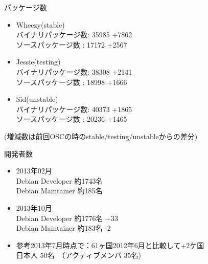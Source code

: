 \begin{frame}{パッケージ数}
\begin{itemize}

\item Wheezy(stable)\\
バイナリパッケージ数: 35985 {\color{red}+7862}\\
ソースパッケージ数  : 17172 {\color{red}+2567}\\
\item Jessie(testing)\\ 
バイナリパッケージ数: 38308 {\color{red}+2141}\\
ソースパッケージ数  : 18998 {\color{red}+1666}\\
\item Sid(unstable)\\ 
バイナリパッケージ数: 40373 {\color{red}+1865}\\
ソースパッケージ数  : 20236 {\color{red}+1465}\\
\end{itemize}
(増減数は前回OSCの時のstable/testing/unstableからの差分)
\end{frame}



\begin{frame}{開発者数}
\begin{itemize}
\item 2013年02月\\
Debian Developer 約1743名 \\
Debian Maintainer 約185名
\item 2013年10月\\
Debian Developer 約1776名 {\color{red}+33}\\
Debian Maintainer 約183名 {\color{blue}-2}\\

\item 参考2013年7月時点で：61ヶ国{2012年6月と比較して\color{red}+2ケ国}\\
日本人  50名　（アクティブメンバ 35名)

\end{itemize}
\end{frame}

